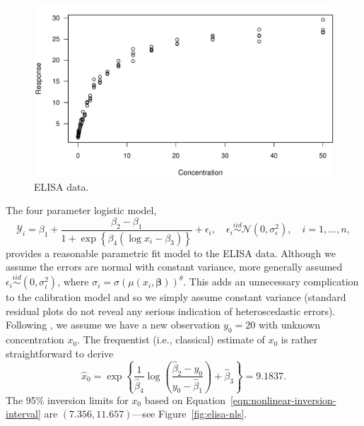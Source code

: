 \documentclass[cmfont,usenames,dvipsnames,leqno]{afit-etd}\usepackage[]{graphicx}\usepackage[]{color}
\makeatletter
\def\maxwidth{ %
  \ifdim\Gin@nat@width>\linewidth
    \linewidth
  \else
    \Gin@nat@width
  \fi
}
\newenvironment{knitrout}{}{} %
\renewenvironment{knitrout}{\begin{singlespace}}{\end{singlespace}}
\newcommand{\mc}[1]{\ensuremath{\mathcal{#1}}}
\newcommand{\wh}[1]{\ensuremath{\widehat{#1}}}
\makeatother
\begin{document}
\begin{knitrout}
\color{fgcolor}\begin{figure}[H]

\includegraphics[width=\maxwidth]{figure/elisa-scatter} \caption[ELISA data]{ELISA data.\label{fig:elisa-scatter}}
\end{figure}


\end{knitrout}


The four parameter logistic model, 
\begin{equation*}
  \mc{Y}_i = \beta_1 + \frac{\beta_2 - \beta_1}{1 + \exp\left\{ \beta_4(\log x_i - \beta_3) \right\}} + \epsilon_i, \quad \epsilon_i \stackrel{iid}{\sim} \mc{N}\left(0, \sigma_\epsilon^2\right), \quad i = 1, \dotsc, n,
\end{equation*}
provides a reasonable parametric fit model to the ELISA data. Although we assume the errors are normal with constant variance, \citet{ori_constructing_1995} more generally assumed $\epsilon_i \stackrel{iid}{\sim} (0, \sigma_i^2)$, where $\sigma_i = \sigma\left(\mu(x_i, \bm{\beta})\right)^\theta$. This adds an unnecessary complication to the calibration model and so we simply assume constant variance (standard residual plots do not reveal any serious indication of heteroscedastic errors). Following \citet{ori_constructing_1995}, we assume we have a new observation $y_0 = 20$ with unknown concentration $x_0$. The frequentist (i.e., classical) estimate of $x_0$ is rather straightforward to derive
\begin{equation*}
  \wh{x}_0 = \exp\left\{\frac{1}{\wh{\beta}_4}\log\left(\frac{\wh{\beta}_2-y_0}{y_0-\wh{\beta}_1}\right) + \wh{\beta}_3\right\} = 9.1837.
\end{equation*}
The 95\% inversion limits for $x_0$ based on Equation~\eqref{eqn:nonlinear-inversion-interval} are $(7.356, 11.657)$---see Figure~\ref{fig:elisa-nls}. 
\end{document}
